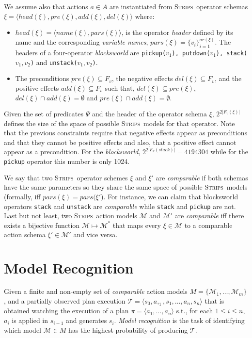 \documentclass[letterpaper]{article} %
\newcommand{\tup}[1]{{\langle #1 \rangle}}
\newcommand{\strips}{\textsc{Strips}}     %
\begin{document}
We assume also that actions $a\in A$ are instantiated from \strips\ operator schemas $\xi=\tup{head(\xi),pre(\xi),add(\xi),del(\xi)}$ where:
\begin{itemize}
\item $head(\xi)=\tup{name(\xi),pars(\xi)}$, is the operator {\em header} defined by its name and the corresponding {\em variable names}, $pars(\xi)=\{v_i\}_{i=1}^{ar(\xi)}$. The headers of a four-operator {\em blocksworld} are {\small\tt pickup($v_1$), putdown($v_1$), stack($v_1,v_2$)} and {\small\tt unstack($v_1,v_2$)}.
\item The preconditions $pre(\xi)\subseteq F_v$, the negative effects $del(\xi)\subseteq F_v$, and the positive effects $add(\xi)\subseteq F_v$ such that, $del(\xi)\subseteq pre(\xi)$, $del(\xi)\cap add(\xi)=\emptyset$ and $pre(\xi)\cap add(\xi)=\emptyset$.
\end{itemize}
Given the set of predicates $\Psi$ and the header of the operator schema $\xi$, $2^{2|F_v(\xi)|}$ defines the size of the space of possible \strips\ models for that operator. Note that the previous constraints require that negative effects appear as preconditions and that they cannot be positive effects and also, that a positive effect cannot appear as a precondition. For the {\em blocksworld}, $2^{2|F_v(stack)|}=4194304$ while for the {\small\tt pickup} operator this number is only 1024.

We say that two \strips\ operator schemes $\xi$ and $\xi'$ are {\em comparable} if both schemas have the same parameters so they share the same space of possible \strips\ models (formally, iff $pars(\xi)=pars(\xi'$). For instance, we can claim that blocksworld operators {\small\tt stack} and {\small\tt unstack} are {\em comparable} while  {\small\tt stack} and {\small\tt pickup} are not. Last but not least, two \strips\ action models $\mathcal{M}$ and $\mathcal{M}'$ are {\em comparable} iff there exists a bijective function $\mathcal{M} \mapsto \mathcal{M}^*$ that maps every $\xi\in\mathcal{M}$ to a comparable action schema $\xi'\in\mathcal{M'}$ and vice versa.


\section{Model Recognition}
\label{sec:recognition}
Given a finite and non-empty set of {\em comparable} action models $M=\{\mathcal{M}_1,\ldots,\mathcal{M}_m\}$, and a partially observed plan execution $\mathcal{T}=\tup{s_0,a,_1,s_1,\ldots,a_n,s_{n}}$ that is obtained watching the execution of a plan $\pi=\tup{a_1, \ldots, a_n}$ s.t., for each {\small $1\leq i\leq n$}, $a_i$ is applied in $s_{i-1}$ and generates $s_i$. {\em Model recognition} is the task of identifying which model $\mathcal{M}\in M$ has the highest probability of producing $\mathcal{T}$.
\end{document}
